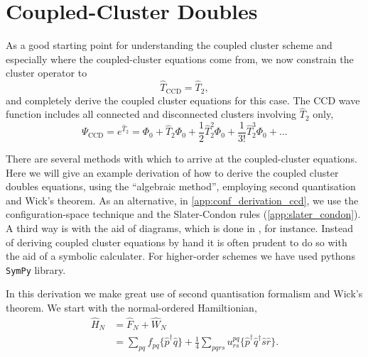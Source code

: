 \section{Coupled-Cluster Doubles}

As a good starting point for understanding the coupled cluster scheme and especially
where the coupled-cluster equations come from, we now constrain the cluster
operator to
\begin{equation}
    \hat{T}_{\text{CCD}} = \hat{T}_2,
\end{equation}
and completely derive the coupled cluster equations for this case.
The CCD wave function includes all connected and disconnected clusters involving
$\hat{T}_2$ only,
\begin{equation}
    \Psi_{\text{CCD}} = e^{\hat{T}_2} = \Phi_0 + \hat{T}_2\Phi_0 + \frac{1}{2}\hat{T}_2^2\Phi_0 
        + \frac{1}{3!}\hat{T}_2^3\Phi_0 + \dots
\end{equation}

There are several methods with which to arrive at the coupled-cluster equations. 
Here we will give an example derivation of how to derive the coupled cluster doubles
equations, using the ``algebraic method'',
employing second quantisation and Wick's theorem. As an alternative,
in \autoref{app:conf_derivation_ccd}, we use the
configuration-space technique and the Slater-Condon rules (\autoref{app:slater_condon}).
A third way is with the aid of
diagrams, which is done in \citeauthor{shavitt2009many}\cite{shavitt2009many}, for instance.
Instead of deriving coupled cluster equations by hand it is often prudent to 
do so with the aid of a symbolic calculater. For higher-order schemes we have used pythons 
\lstinline{SymPy} library.

In this derivation we make great use of second quantisation formalism and Wick's 
theorem. We start with the normal-ordered Hamiltionian,
\begin{equation}
    \begin{aligned}
    \hat{H}_N &= \hat{F}_N  + \hat{W}_N \\
        &= \sum_{pq} f_{pq} \{ \hat{p}^\dagger \hat{q} \}
            + \frac{1}{4} \sum_{pqrs} u^{pq}_{rs} \{\hat{p}^\dagger\hat{q}^\dagger\hat{s}\hat{r}\}.
    \end{aligned}
\end{equation}


